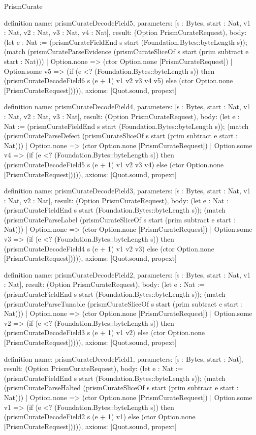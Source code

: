 \begin{lexlean}{PrismCurate}
\begin{semanticmodule}
definition{
  name: prismCurateDecodeField5,
  parameters: [s : Bytes, start : Nat, v1 : Nat, v2 : Nat, v3 : Nat, v4 : Nat],
  result: (Option PrismCurateRequest),
  body: (let e : Nat := (prismCurateFieldEnd s start (Foundation.Bytes::byteLength s)); (match (prismCurateParseEvidence (prismCurateSliceOf s start (prim subtract e start : Nat)))
    | Option.none => (ctor Option.none [PrismCurateRequest])
    | Option.some v5 => (if (e <? (Foundation.Bytes::byteLength s)) then (prismCurateDecodeField6 s (e + 1) v1 v2 v3 v4 v5) else (ctor Option.none [PrismCurateRequest])))),
  axioms: [Quot.sound, propext]
}

definition{
  name: prismCurateDecodeField4,
  parameters: [s : Bytes, start : Nat, v1 : Nat, v2 : Nat, v3 : Nat],
  result: (Option PrismCurateRequest),
  body: (let e : Nat := (prismCurateFieldEnd s start (Foundation.Bytes::byteLength s)); (match (prismCurateParseDefect (prismCurateSliceOf s start (prim subtract e start : Nat)))
    | Option.none => (ctor Option.none [PrismCurateRequest])
    | Option.some v4 => (if (e <? (Foundation.Bytes::byteLength s)) then (prismCurateDecodeField5 s (e + 1) v1 v2 v3 v4) else (ctor Option.none [PrismCurateRequest])))),
  axioms: [Quot.sound, propext]
}

definition{
  name: prismCurateDecodeField3,
  parameters: [s : Bytes, start : Nat, v1 : Nat, v2 : Nat],
  result: (Option PrismCurateRequest),
  body: (let e : Nat := (prismCurateFieldEnd s start (Foundation.Bytes::byteLength s)); (match (prismCurateParseLabel (prismCurateSliceOf s start (prim subtract e start : Nat)))
    | Option.none => (ctor Option.none [PrismCurateRequest])
    | Option.some v3 => (if (e <? (Foundation.Bytes::byteLength s)) then (prismCurateDecodeField4 s (e + 1) v1 v2 v3) else (ctor Option.none [PrismCurateRequest])))),
  axioms: [Quot.sound, propext]
}

definition{
  name: prismCurateDecodeField2,
  parameters: [s : Bytes, start : Nat, v1 : Nat],
  result: (Option PrismCurateRequest),
  body: (let e : Nat := (prismCurateFieldEnd s start (Foundation.Bytes::byteLength s)); (match (prismCurateParseTunable (prismCurateSliceOf s start (prim subtract e start : Nat)))
    | Option.none => (ctor Option.none [PrismCurateRequest])
    | Option.some v2 => (if (e <? (Foundation.Bytes::byteLength s)) then (prismCurateDecodeField3 s (e + 1) v1 v2) else (ctor Option.none [PrismCurateRequest])))),
  axioms: [Quot.sound, propext]
}

definition{
  name: prismCurateDecodeField1,
  parameters: [s : Bytes, start : Nat],
  result: (Option PrismCurateRequest),
  body: (let e : Nat := (prismCurateFieldEnd s start (Foundation.Bytes::byteLength s)); (match (prismCurateParseHalted (prismCurateSliceOf s start (prim subtract e start : Nat)))
    | Option.none => (ctor Option.none [PrismCurateRequest])
    | Option.some v1 => (if (e <? (Foundation.Bytes::byteLength s)) then (prismCurateDecodeField2 s (e + 1) v1) else (ctor Option.none [PrismCurateRequest])))),
  axioms: [Quot.sound, propext]
}


\end{semanticmodule}
\end{lexlean}
